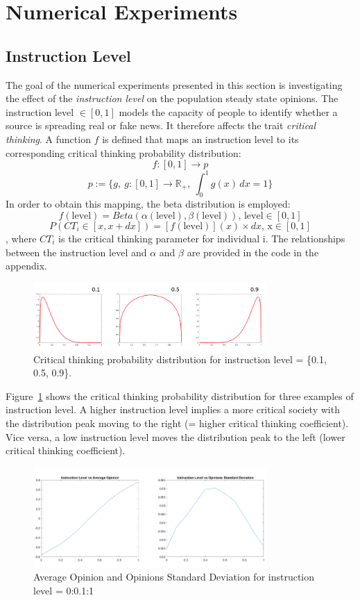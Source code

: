 \section{Numerical Experiments}

\subsection{Instruction Level}
The goal of the numerical experiments presented in this section is investigating the effect of the \emph{instruction level} on the population steady state opinions. The instruction level $\in [0,1]$ models the capacity of people to identify whether a source is spreading real or fake news. It therefore affects the trait \emph{critical thinking}. A function $f$ is defined that maps an instruction level to its corresponding critical thinking probability distribution:
$$
f: [0,1] \to p 
$$
$$
p:= \{g,\ g: [0,1] \to \mathbb{R}_+,\ \int_{0}^{1} g(x) \,dx = 1\}
$$
In order to obtain this mapping, the beta distribution is employed: 
$$
f(\text{level}) = Beta(\alpha(\text{level}), \beta(\text{level}))\text{, level} \in [0,1]
$$
$$
P(CT_i\in[x,x+dx]) = [f(\text{level})](x)\times dx\text{, x}\in [0,1]
$$
, where $CT_i$ is the critical thinking parameter for individual i. The relationships between the instruction level and $\alpha$ and $\beta$ are provided in the code in the appendix. 
\begin{figure}[!t]
	\centering
	\includegraphics[width=3.5in]{Figures/instruction_level_dist.png}
	\caption{Critical thinking probability distribution for instruction level = \{0.1, 0.5, 0.9\}.}
	\label{pics:critdistribution}
\end{figure}
Figure~\ref{pics:critdistribution} shows the critical thinking probability distribution for three examples of instruction level. A higher instruction level implies a more critical society with the distribution peak moving to the right (= higher critical thinking coefficient). Vice versa, a low instruction level moves the distribution peak to the left (lower critical thinking coefficient). \newline
\begin{figure}[!t]
	\centering
	\includegraphics[width=3.5in]{Figures/instruction_results.png}
	\caption{Average Opinion and Opinions Standard Deviation for instruction level = 0:0.1:1}
	\label{pics:critstatistics}
\end{figure}
